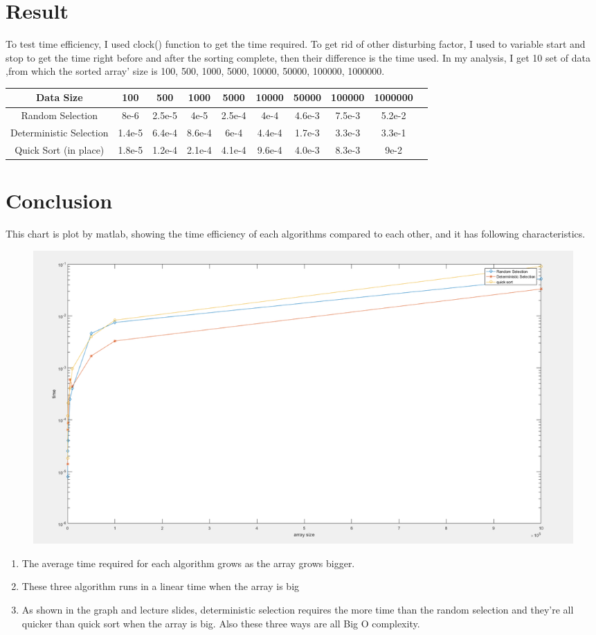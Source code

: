 \documentclass[12pt]{article}
\begin{document}
\section{Result}
To test time efficiency, I used clock() function to get the time required. To get rid of other disturbing factor, I used to variable start and stop to get the time right before and after the sorting complete, then their difference is the time used. In my analysis, I get 10 set of data ,from which the sorted array' size is 100, 500, 1000, 5000, 10000, 50000, 100000, 1000000.
\begin{table}[H]
\centering
\begin{tabular}{|c|c|c|c|c|c|c|c|c|c|}
\hline
Data Size                 & 100    & 500   & 1000     & 5000    & 10000    & 50000   & 100000   & 1000000  \\ \hline
Random Selection               &8e-6& 2.5e-5& 4e-5 & 2.5e-4 & 4e-4 & 4.6e-3 & 7.5e-3 &5.2e-2      \\ \hline
Deterministic Selection        &1.4e-5& 6.4e-4& 8.6e-4 & 6e-4 & 4.4e-4 & 1.7e-3 & 3.3e-3 &3.3e-1  \\ \hline
Quick Sort (in place)     &1.8e-5& 1.2e-4 & 2.1e-4 & 4.1e-4 & 9.6e-4 & 4.0e-3& 8.3e-3 & 9e-2  \\ \hline
\end{tabular}
\end{table}
\section{Conclusion}
This chart is plot by matlab, showing the time efficiency of each algorithms compared to each other, and it has following characteristics.
\begin{figure}[H]
\centering
\includegraphics[scale=0.2]{P3.png}
\end{figure}
\begin{enumerate}
\item The average time required for each algorithm grows as the array grows bigger.
\item These three algorithm runs in a linear time when the array is big
\item As shown in the graph and lecture slides, deterministic selection requires the more time than the random selection and they're all quicker than quick sort when the array is big. Also these three ways are all Big O complexity.
\end{enumerate}
\end{document}
